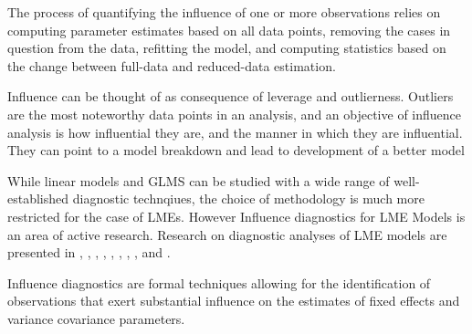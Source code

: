 \documentclass[12pt, a4paper]{report}
\theoremstyle{plain}
\theoremstyle{definition}
\theoremstyle{remark}
\begin{document}
	
	
	The process of quantifying the influence of one or more observations relies on computing parameter estimates based on all data points, removing the cases in question from the data, refitting the model, and computing statistics based on the change between full-data and reduced-data estimation.	
	
	Influence can be thought of as consequence of leverage and outlierness. Outliers are the most noteworthy data points in an analysis, and an objective of influence analysis is how influential they are, and the manner in which they are influential. They can point to a model breakdown and lead to development of a better model
	
	While linear models and GLMS can be studied with a wide range of well-established diagnostic technqiues, the choice of methodology is much more restricted for the case of LMEs. However
	Influence diagnostics for LME Models is an area of active research. Research on diagnostic analyses of LME models are presented in \citet{Beckman}, 
	\citet{Christensen}, \citet{HildenMinton}, \citet{lesaffre1998local}, \citet{Banerjee1997}, 
	\citet{fung2002}, \citet{Demi}, \citet{Zewotir}, \citet{zewotir2008} and \citet{NobreSinger2007, NobreSinger2011}.
	
	
	
	
	Influence diagnostics are formal techniques allowing for the identification of observations that exert substantial  influence on the estimates of fixed effects and variance covariance parameters.
	
\end{document}
